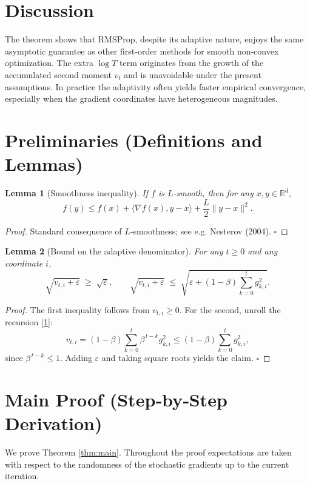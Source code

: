 \documentclass{article}
\newtheorem{lemma}{Lemma}
\newcommand{\R}{\mathbb{R}}
\begin{document}
\section*{Discussion}
The theorem shows that RMSProp, despite its adaptive nature, enjoys the same
asymptotic guarantee as other first‑order methods for smooth non‑convex
optimization. The extra $\log T$ term originates from the growth of the
accumulated second moment $v_t$ and is unavoidable under the present
assumptions. In practice the adaptivity often yields faster empirical
convergence, especially when the gradient coordinates have heterogeneous
magnitudes.

\newpage
\section*{Preliminaries (Definitions and Lemmas)}
\begin{lemma}[Smoothness inequality]\label{lem:smooth}
If $f$ is $L$‑smooth, then for any $x,y\in\R^d$,
\[
f(y)\le f(x)+\langle\nabla f(x),y-x\rangle+\frac{L}{2}\|y-x\|^2.
\tag{L1}
\]
\end{lemma}
\begin{proof}
Standard consequence of $L$‑smoothness; see e.g. Nesterov (2004). \hfill $\square$
\end{proof}

\begin{lemma}[Bound on the adaptive denominator]\label{lem:denom}
For any $t\ge0$ and any coordinate $i$,
\[
\sqrt{v_{t,i}+\varepsilon}\;\ge\;\sqrt{\varepsilon},
\qquad
\sqrt{v_{t,i}+\varepsilon}\;\le\;\sqrt{\varepsilon+ (1-\beta) \sum_{k=0}^{t} g_{k,i}^2 }.
\tag{L2}
\]
\end{lemma}
\begin{proof}
The first inequality follows from $v_{t,i}\ge0$.
For the second, unroll the recursion \eqref{1}:
\[
v_{t,i}= (1-\beta)\sum_{k=0}^{t}\beta^{\,t-k} g_{k,i}^2
\le (1-\beta)\sum_{k=0}^{t} g_{k,i}^2,
\]
since $\beta^{\,t-k}\le1$. Adding $\varepsilon$ and taking square roots yields
the claim. \hfill $\square$
\end{proof}

\section*{Main Proof (Step‑by‑Step Derivation)}
We prove Theorem \ref{thm:main}.  Throughout the proof expectations are taken
with respect to the randomness of the stochastic gradients up to the current
iteration.
\end{document}
